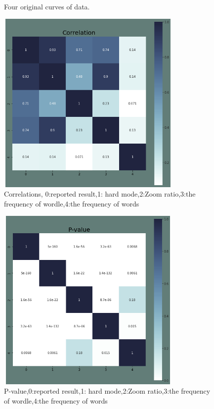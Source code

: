 \documentclass[12pt]{article}
\begin{document}
\begin{figure}[htbp]
{	}
	\hspace{2mm}
	\caption{Four original curves of data.}
\end {figure}

\begin{figure}
	
	\centering
	
	\includegraphics[height=9cm, width=9cm]{COR_re.png}
	\caption{Correlations, 0:reported result,1: hard mode,2:Zoom ratio,3:the frequency of wordle,4:the frequency of words}
	\end{figure}
	
	\begin{figure}[htbp]
	
		\centering
		\includegraphics[height=9cm, width=9cm]{PER_re.png}
		\caption{P-value,0:reported result,1: hard mode,2:Zoom ratio,3:the frequency of wordle,4:the frequency of words}
	
\end{figure}
\end{document}
